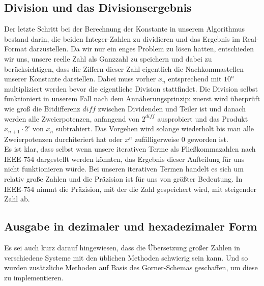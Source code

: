 \documentclass[course=erap]{aspdoc}
\begin{document}
\subsection{Division und das Divisionsergebnis}%
Der letzte Schritt bei der Berechnung der Konstante in unserem Algorithmus bestand darin, die beiden Integer-Zahlen zu dividieren und das Ergebnis im Real-Format darzustellen. Da wir nur ein enges Problem zu lösen hatten, entschieden wir uns, unsere reelle Zahl als Ganzzahl zu speichern und dabei zu berücksichtigen, dass die Ziffern dieser Zahl eigentlich die Nachkommastellen unserer Konstante darstellen. Dabei muss vorher $x_n$ entsprechend mit $10^n$ multipliziert werden bevor die eigentliche Division stattfindet. Die Division selbst funktioniert in unserem Fall nach dem Annäherungsprinzip: zuerst wird überprüft wie groß die Bitdifferenz $diff$ zwischen Dividenden und Teiler ist und danach werden alle Zweierpotenzen, anfangend von $2^{diff}$ ausprobiert und das Produkt $x_{n+1} \cdot 2^i$ von $x_n$ subtrahiert. Das Vorgehen wird solange wiederholt bis man alle Zweierpotenzen durchiteriert hat oder $x^n$ zufälligerweise $0$ geworden ist.\\
Es ist klar, dass selbst wenn unsere iterativen Terme als Fließkommazahlen nach IEEE-754 dargestellt werden könnten, das Ergebnis dieser Aufteilung für uns nicht funktionieren würde.  Bei unseren iterativen Termen handelt es sich um relativ große Zahlen und die Präzision ist für uns von größter Bedeutung. In IEEE-754 nimmt die Präzision, mit der die Zahl gespeichert wird, mit steigender Zahl ab. 

\subsection{Ausgabe in dezimaler und hexadezimaler Form }%
Es sei auch kurz darauf hingewiesen, dass die Übersetzung großer Zahlen in verschiedene Systeme mit den üblichen Methoden schwierig sein kann. Und so wurden zusätzliche Methoden auf Basis des Gorner-Schemas \cite{Gorner} geschaffen, um diese zu implementieren.
\end{document}
